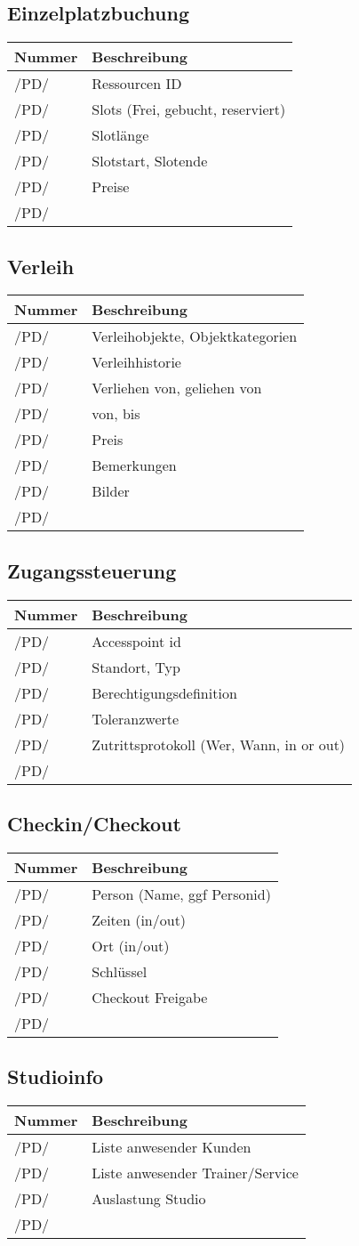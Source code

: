 \documentclass[a4paper,12pt]{article}
\newcommand\addrow[2]{#1 &#2\\ }
\newcommand\addheading[2]{#1 &#2\\ \hline}
\newcommand\tabularhead{\begin{tabular}{lp{13cm}}
\hline
}
\newenvironment{usecase}{\tabularhead}
{\hline\end{tabular}}
\begin{document}
\subsection{Einzelplatzbuchung}
\begin{usecase}
  \addheading{Nummer}{Beschreibung} 
  \addrow{/PD/}{Ressourcen ID}
  \addrow{/PD/}{Slots (Frei, gebucht, reserviert)}
  \addrow{/PD/}{Slotlänge}
  \addrow{/PD/}{Slotstart, Slotende}
  \addrow{/PD/}{Preise}
  \addrow{/PD/}{}
\end{usecase}

\subsection{Verleih}
\begin{usecase}
  \addheading{Nummer}{Beschreibung} 
  \addrow{/PD/}{Verleihobjekte, Objektkategorien}
  \addrow{/PD/}{Verleihhistorie}
  \addrow{/PD/}{Verliehen von, geliehen von}
  \addrow{/PD/}{von, bis}
  \addrow{/PD/}{Preis}
  \addrow{/PD/}{Bemerkungen}
  \addrow{/PD/}{Bilder}
  \addrow{/PD/}{}
\end{usecase}

\subsection{Zugangssteuerung}
\begin{usecase}
  \addheading{Nummer}{Beschreibung} 
  \addrow{/PD/}{Accesspoint id}
  \addrow{/PD/}{Standort, Typ}
  \addrow{/PD/}{Berechtigungsdefinition}
  \addrow{/PD/}{Toleranzwerte}
  \addrow{/PD/}{Zutrittsprotokoll (Wer, Wann, in or out)}
  \addrow{/PD/}{}
\end{usecase}

\subsection{Checkin/Checkout}
\begin{usecase}
  \addheading{Nummer}{Beschreibung} 
  \addrow{/PD/}{Person (Name, ggf Personid)}
  \addrow{/PD/}{Zeiten (in/out)}
  \addrow{/PD/}{Ort (in/out)}
  \addrow{/PD/}{Schlüssel}
  \addrow{/PD/}{Checkout Freigabe}
  \addrow{/PD/}{}
\end{usecase}

\subsection{Studioinfo}
\begin{usecase}
  \addheading{Nummer}{Beschreibung} 
  \addrow{/PD/}{Liste anwesender Kunden}
  \addrow{/PD/}{Liste anwesender Trainer/Service}
  \addrow{/PD/}{Auslastung Studio}
  \addrow{/PD/}{}
\end{usecase}
\end{document}

